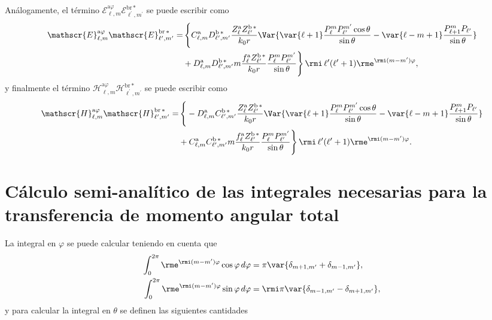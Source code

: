 %
Análogamente, el término $\mathscr{E}_{\ell, m}^{\text{a}\varphi}\mathscr{E}_{\ell^{\prime}, m^{\prime}}^{\text{br}\,*}$ se puede escribir como
\begin{align}
\mathscr{E}_{\ell, m}^{\text{a}\varphi}\mathscr{E}_{\ell^{\prime}, m^{\prime}}^{\text{br}\,*} =& \, \Bigg\{ C_{\ell, m}^{\rm a} D_{\ell^{\prime}, m^{\prime}}^{\rm b \, *} \frac{Z_{\ell}^{\rm a} Z_{\ell^{\prime}}^{\rm b \, *}}{k_0 r} \Var{\var{\ell +1} \frac{P_{\ell}^{m} P_{\ell^{\prime}}^{m^{\prime}}\cos\theta}{\sin\theta} -\var{\ell - m +1}\frac{P_{\ell+1}^m P_{\ell^{\prime}}}{\sin\theta} }\nonumber\\
& + D_{\ell, m}^{\rm a} D_{\ell^{\prime}, m^{\prime}}^{\rm b \, *} m \frac{f_{\ell}^{\rm a} Z_{\ell^{\prime}}^{\rm b\, *}}{k_0 r} \frac{P_{\ell}^{m} P_{\ell^{\prime}}^{m^{\prime}}}{\sin\theta} \Bigg\} \, \rmi \, \ell^{\prime}(\ell^{\prime}+1)  \rme^{\rmi (m-m^{\prime})\varphi },
\end{align}
%
y finalmente el término $\mathscr{H}_{\ell, m}^{\text{a}\varphi}\mathscr{H}_{\ell^{\prime}, m^{\prime}}^{\text{br}\,*}$ se puede escribir como
\begin{align}
\mathscr{H}_{\ell, m}^{\text{a}\varphi}\mathscr{H}_{\ell^{\prime}, m^{\prime}}^{\text{br}\,*} =& \, \Bigg\{ -D_{\ell, m}^{\rm a} C_{\ell^{\prime}, m^{\prime}}^{\rm b \, *} \frac{Z_{\ell}^{\rm a} Z_{\ell^{\prime}}^{\rm b \, *}}{k_0 r} \Var{\var{\ell +1} \frac{P_{\ell}^{m} P_{\ell^{\prime}}^{m^{\prime}}\cos\theta}{\sin\theta} -\var{\ell - m +1}\frac{P_{\ell+1}^m P_{\ell^{\prime}}}{\sin\theta} }\nonumber\\
& + C_{\ell, m}^{\rm a} C_{\ell^{\prime}, m^{\prime}}^{\rm b \, *} m \frac{f_{\ell}^{\rm a} Z_{\ell^{\prime}}^{\rm b\, *}}{k_0 r} \frac{P_{\ell}^{m} P_{\ell^{\prime}}^{m^{\prime}}}{\sin\theta} \Bigg\} \, \rmi \, \ell^{\prime}(\ell^{\prime}+1)  \rme^{\rmi (m-m^{\prime})\varphi }.
\end{align}

\section{Cálculo semi-analítico de las integrales necesarias para la transferencia de momento angular total}
La integral en $\varphi$ se puede calcular teniendo en cuenta que 
\begin{align}
\int_0^{2\pi} \rme^{\rmi (m-m^{\prime}) \varphi} \cos\varphi  \, d\varphi &= \pi \var{ \delta_{m+1, m^{\prime}} + \delta_{m-1, m^{\prime}} },\\
\int_0^{2\pi} \rme^{\rmi (m-m^{\prime}) \varphi} \sin\varphi  \, d\varphi &= \rmi \pi \var{ \delta_{m-1, m^{\prime}} - \delta_{m+1, m^{\prime}} },
\end{align}
\vspace{-0.8 cm}
y para calcular la integral en $\theta$ se definen las siguientes cantidades

